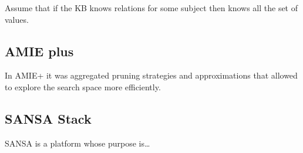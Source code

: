 \documentclass{article}
\begin{document}
Assume that if the KB knows relations for some subject then knows all the set
of values.


\subsection{AMIE plus}

In AMIE+ it was aggregated pruning strategies and approximations that allowed
to explore the search space more efficiently.

\subsection{SANSA Stack}

SANSA is a platform whose purpose is\ldots



\end{document}
